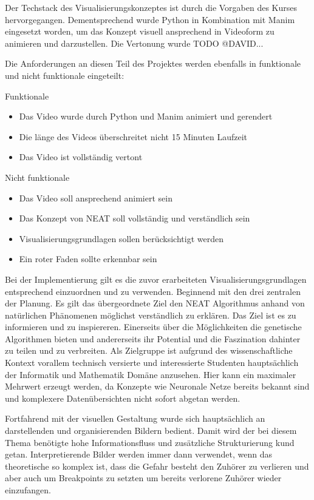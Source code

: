 Der Techstack des Visualisierungskonzeptes ist durch die Vorgaben des Kurses hervorgegangen. Dementsprechend wurde Python in Kombination mit Manim eingesetzt worden, um das Konzept visuell ansprechend in Videoform zu animieren und darzustellen. Die Vertonung wurde TODO @DAVID...

Die Anforderungen an diesen Teil des Projektes werden ebenfalls in funktionale und nicht funktionale eingeteilt:  

Funktionale 
\begin{itemize}

	\item Das Video wurde durch Python und Manim animiert und gerendert 
	\item Die länge des Videos überschreitet nicht 15 Minuten Laufzeit
	\item Das Video ist vollständig vertont
	
\end{itemize}

Nicht funktionale
\begin{itemize}

	\item Das Video soll ansprechend animiert sein
	\item Das Konzept von NEAT soll vollständig und verständlich sein
	\item Visualisierungsgrundlagen sollen berücksichtigt werden
	\item Ein roter Faden sollte erkennbar sein

\end{itemize}

Bei der Implementierung gilt es die zuvor erarbeiteten Visualisierungsgrundlagen entsprechend einzuordnen und zu verwenden. Beginnend mit den drei zentralen der Planung. Es gilt das übergeordnete Ziel den NEAT Algorithmus anhand von natürlichen Phänomenen möglichst verständlich zu erklären. Das Ziel ist es zu informieren und zu inspiereren. Einerseits über die Möglichkeiten die genetische Algorithmen bieten und andererseits ihr Potential und die Faszination dahinter zu teilen und zu verbreiten. Als Zielgruppe ist aufgrund des wissenschaftliche Kontext vorallem technisch versierte und interessierte Studenten hauptsächlich der Informatik und Mathematik Domäne anzusehen. Hier kann ein maximaler Mehrwert erzeugt werden, da Konzepte wie Neuronale Netze bereits bekannt sind und komplexere Datenübersichten nicht sofort abgetan werden. 

Fortfahrend mit der visuellen Gestaltung wurde sich hauptsächlich an darstellenden und organisierenden Bildern bedient. Damit wird der bei diesem Thema benötigte hohe Informationsfluss und zusätzliche Strukturierung kund getan. Interpretierende Bilder werden immer dann verwendet, wenn das theoretische so komplex ist, dass die Gefahr besteht den Zuhörer zu verlieren und aber auch um Breakpoints zu setzten um bereits verlorene Zuhörer wieder einzufangen. 

